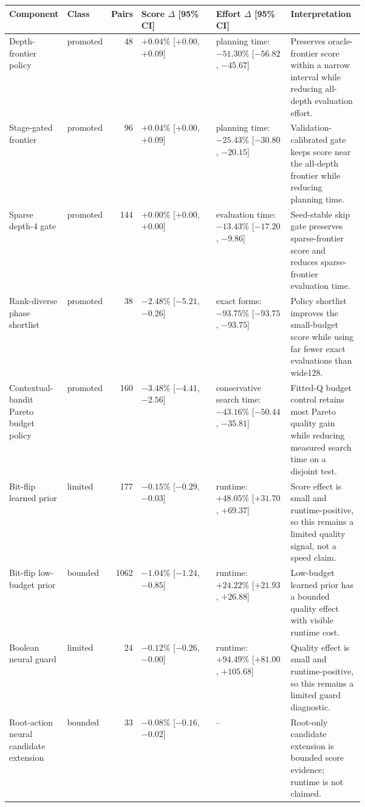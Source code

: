 \begin{tabularx}{\linewidth}{>{\raggedright\arraybackslash}p{0.16\linewidth}>{\raggedright\arraybackslash}p{0.10\linewidth}r>{\raggedleft\arraybackslash}p{0.21\linewidth}>{\raggedleft\arraybackslash}p{0.21\linewidth}>{\raggedright\arraybackslash}X}
\toprule
Component & Class & Pairs & Score $\Delta$ [95\% CI] & Effort $\Delta$ [95\% CI] & Interpretation \\
\midrule
Depth-frontier policy & promoted & 48 & $+0.04\%$ [$+0.00$, $+0.09$] & planning time: $-51.30\%$ [$-56.82$, $-45.67$] & Preserves oracle-frontier score within a narrow interval while reducing all-depth evaluation effort. \\
Stage-gated frontier & promoted & 96 & $+0.04\%$ [$+0.00$, $+0.09$] & planning time: $-25.43\%$ [$-30.80$, $-20.15$] & Validation-calibrated gate keeps score near the all-depth frontier while reducing planning time. \\
Sparse depth-4 gate & promoted & 144 & $+0.00\%$ [$+0.00$, $+0.00$] & evaluation time: $-13.43\%$ [$-17.20$, $-9.86$] & Seed-stable skip gate preserves sparse-frontier score and reduces sparse-frontier evaluation time. \\
Rank-diverse phase shortlist & promoted & 38 & $-2.48\%$ [$-5.21$, $-0.26$] & exact forms: $-93.75\%$ [$-93.75$, $-93.75$] & Policy shortlist improves the small-budget score while using far fewer exact evaluations than wide128. \\
Contextual-bandit Pareto budget policy & promoted & 160 & $-3.48\%$ [$-4.41$, $-2.56$] & conservative search time: $-43.16\%$ [$-50.44$, $-35.81$] & Fitted-Q budget control retains most Pareto quality gain while reducing measured search time on a disjoint test. \\
Bit-flip learned prior & limited & 177 & $-0.15\%$ [$-0.29$, $-0.03$] & runtime: $+48.05\%$ [$+31.70$, $+69.37$] & Score effect is small and runtime-positive, so this remains a limited quality signal, not a speed claim. \\
Bit-flip low-budget prior & bounded & 1062 & $-1.04\%$ [$-1.24$, $-0.85$] & runtime: $+24.22\%$ [$+21.93$, $+26.88$] & Low-budget learned prior has a bounded quality effect with visible runtime cost. \\
Boolean neural guard & limited & 24 & $-0.12\%$ [$-0.26$, $-0.00$] & runtime: $+94.49\%$ [$+81.00$, $+105.68$] & Quality effect is small and runtime-positive, so this remains a limited guard diagnostic. \\
Root-action neural candidate extension & bounded & 33 & $-0.08\%$ [$-0.16$, $-0.02$] & -- & Root-only candidate extension is bounded score evidence; runtime is not claimed. \\
\bottomrule
\end{tabularx}
